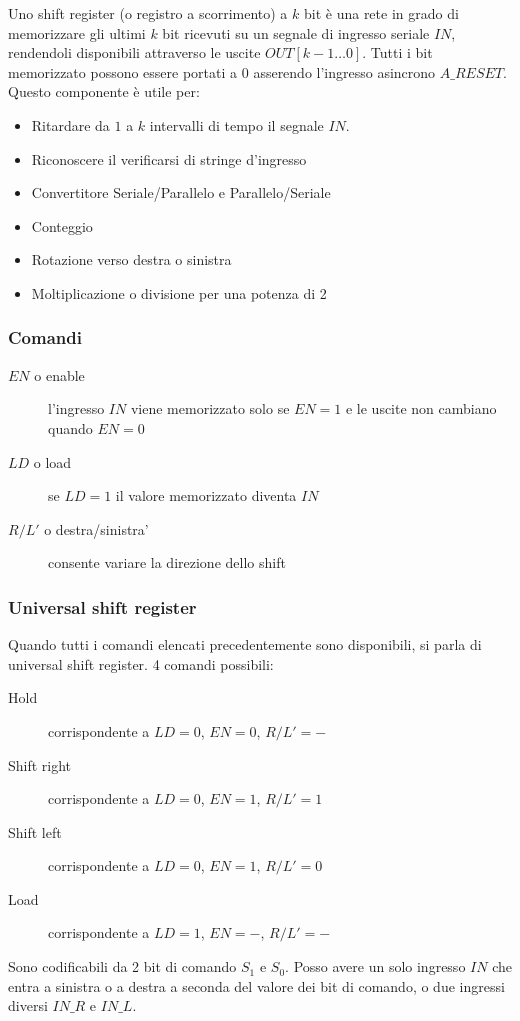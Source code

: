 \documentclass{article}
\begin{document}
Uno shift register (o registro a scorrimento) a $k$ bit è una rete in grado di memorizzare gli ultimi $k$ bit ricevuti su un segnale di ingresso seriale $IN$, rendendoli disponibili attraverso le uscite $OUT[k-1 \dots 0]$.
Tutti i bit memorizzato possono essere portati a $0$ asserendo l'ingresso asincrono $A\_RESET$.
Questo componente è utile per:

\begin{itemize}
    \item Ritardare da $1$ a $k$ intervalli di tempo il segnale $IN$.
    \item Riconoscere il verificarsi di stringe d'ingresso
    \item Convertitore Seriale/Parallelo e Parallelo/Seriale
    \item Conteggio
    \item Rotazione verso destra o sinistra
    \item Moltiplicazione o divisione per una potenza di 2
\end{itemize}

\subsubsection{Comandi}

\begin{description}
    \item[$EN$ o enable] l'ingresso $IN$ viene memorizzato solo se $EN=1$ e le uscite non cambiano quando $EN=0$
    \item[$LD$ o load] se $LD=1$ il valore memorizzato diventa $IN$
    \item[$R/L'$ o destra/sinistra'] consente variare la direzione dello shift
\end{description}

\subsubsection{Universal shift register}

Quando tutti i comandi elencati precedentemente sono disponibili, si parla di universal shift register.
4 comandi possibili:

\begin{description}
    \item[Hold] corrispondente a $LD=0$, $EN=0$, $R/L'=-$
    \item[Shift right] corrispondente a $LD=0$, $EN=1$, $R/L'=1$
    \item[Shift left] corrispondente a $LD=0$, $EN=1$, $R/L'=0$
    \item[Load] corrispondente a $LD=1$, $EN=-$, $R/L'=-$
\end{description}

\noindent
Sono codificabili da 2 bit di comando $S_1$ e $S_0$.
Posso avere un solo ingresso $IN$ che entra a sinistra o a destra a seconda del valore dei bit di comando, o due ingressi diversi $IN\_R$ e $IN\_L$.
\end{document}
